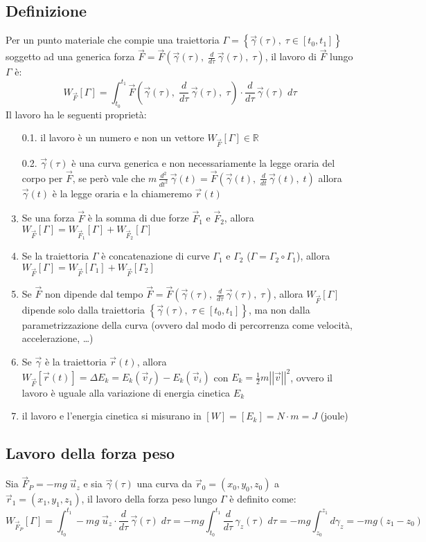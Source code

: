 \documentclass[a4paper]{article}
\newcommand\uz{\vec{u}_z}
\newcommand\ft{\vec{F}\left(\vec{\gamma}(t), \; \dt \vec{\gamma}(t), \; t\right)}
\newcommand\ftau{\vec{F}\left(\vec{\gamma}(\tau), \; \dtau \vec{\gamma}(\tau), \; \tau\right)}
\newcommand\dt{\frac{d}{dt}\,}
\newcommand\dtau{\frac{d}{d\tau}\,}
\newcommand\dts{\frac{d^2}{dt^2}\,}
\newcommand\vmod[1]{\left|\left|{#1}\right|\right|}
\begin{document}
\subsection{Definizione}
Per un punto materiale che compie una traiettoria \(\Gamma = \left\{ \vec{\gamma}(\tau), \; \tau \in \left[ t_0, t_1 \right] \right\}\)
soggetto ad una generica forza \(\displaystyle \vec{F} = \ftau\), il lavoro di \(\vec{F}\)
lungo \(\Gamma\) è:
\[W_{\vec{F}} [\Gamma] = \int_{t_0}^{t_1} \ftau \cdot \dtau \vec{\gamma}(\tau) \; d \tau\]
Il lavoro ha le seguenti proprietà:
\begin{enumerate}
	\item[0.1.] il lavoro è un numero e non un vettore \(W_{\vec{F}} [\Gamma] \in \mathbb{R}\)
	\item[0.2.] \(\vec{\gamma}(\tau)\) è una curva generica e non necessariamente la legge oraria del corpo per \(\vec{F}\), se
	però vale che \(\displaystyle m \, \dts \vec{\gamma}(t) = \ft\)
	allora \(\vec{\gamma}(t)\) è la legge oraria e la chiameremo \(\vec{r}(t)\)
	\item Se una forza \(\vec{F}\) è la somma di due forze \(\vec{F}_1\) e \(\vec{F}_2\), allora \(W_{\vec{F}}[\Gamma] = W_{\vec{F}_1}[\Gamma] + W_{\vec{F}_2}[\Gamma]\)
	\item Se la traiettoria \(\Gamma\) è concatenazione di curve \(\Gamma_1\) e \(\Gamma_2\) (\(\Gamma = \Gamma_2 \circ \Gamma_1\)),
	allora \(W_{\vec{F}}[\Gamma] = W_{\vec{F}}[\Gamma_1] + W_{\vec{F}}[\Gamma_2]\)
	\item Se \(\vec{F}\) non dipende dal tempo \(\displaystyle \vec{F} = \ftau\),
	allora \(W_{\vec{F}}[\Gamma]\) dipende solo dalla traiettoria \(\left\{ \vec{\gamma}(\tau), \; \tau \in \left[ t_0, t_1 \right] \right\}\), ma
	non dalla parametrizzazione della curva (ovvero dal modo di percorrenza come velocità, accelerazione, \dots)
	\item Se \(\vec{\gamma}\) è la traiettoria \(\vec{r}(t)\), allora \(\displaystyle W_{\vec{F}}[{\vec{r}(t)}] = \Delta E_k = E_k(\vec{v}_f) - E_k(\vec{v}_i)\)
	con \(\displaystyle E_k = \frac{1}{2} m \vmod{\vec{v}}^2\), ovvero il lavoro è uguale alla variazione di energia cinetica \(E_k\)
	\item il lavoro e l'energia cinetica si misurano in \([W] = [E_k] = N \cdot m = J\) (joule)
\end{enumerate}

\subsection{Lavoro della forza peso}
Sia \(\vec{F}_P = -mg \; \uz\) e sia \(\vec{\gamma}(\tau)\) una curva da \(\vec{r}_0 = (x_0, y_0, z_0)\) a \(\vec{r}_1 = (x_1, y_1, z_1)\),
il lavoro della forza peso lungo \(\Gamma\) è definito come:
\[W_{\vec{F}_P}[\Gamma] = \int_{t_0}^{t_1} -mg \; \uz \cdot \dtau \vec{\gamma}(\tau) \; d\tau = - mg \int_{t_0}^{t_1} \dtau \gamma_z(\tau) \; d\tau = -mg \int_{z_0}^{z_1} d\gamma_z = -mg (z_1 - z_0)\]
\end{document}
